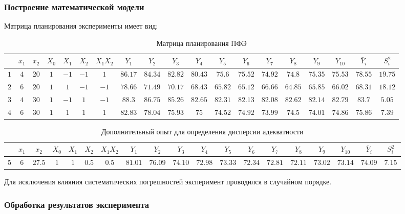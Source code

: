 \documentclass[../../AISTR.tex]{subfiles}
\begin{document}
\subsubsection{Построение математической модели}
Матрица планирования эксперименты имеет вид:
\begin{landscape}
	\begin{table}[H]
		\centering
		\begin{tabular}{|c|c|c|c|c|c|c|c|c|c|c|c|c|c|c|c|c|c|c|}
			\hline
			\textnumero & $x_1$&$x_2$&$X_0$&$X_1$&$X_2$&$X_1X_2$&$Y_1$&$Y_2$&$Y_3$&$Y_4$&$Y_5$&$Y_6$&$Y_7$&$Y_8$&$Y_9$&$Y_{10}$&$\bar{Y}_i$&$S_i^2$\\
			\hline
			$1$& $4$&	$20$&	$1$&	$-1$	&$-1$&	$1$&	$86.17$	&$84.34$&	$82.82$&	$80.43$&$	75.6$&	$75.52$&	$74.92$&	$74.8$&$	75.35$&	$75.53$&	$78.55$	&$19.75$
			\\
			\hline
			$2$&	$6$&	$20$&	$1$&	$1$&	$-1$&$	-1$&	$78.66$&	$71.49$&	$70.17$&	$68.43$&	$65.82$&	$65.12$&	$66.66$	&$64.85$&	$65.85$&	$66.02$&	$68.31$&	$18.12$
			\\
			\hline
			$3$&	$4$&	$30$&$	1$&	$-1$&	$1$	&$-1$	&$88.3$&	$86.75$&	$85.26$&	$82.65$&	$82.31$&	$82.13$&	$82.08$&	$82.62$&	$82.14$&	$82.79$	&$83.7$&	$5.05$
			\\
			\hline
			$4$	&$6$&	$30$	&$1$&	$1$&	$1$&	$1$&	$82.83$&	$78.04$&	$75.93$&	$75$	&$74.52$&	$74.92$&	$73.99$&	$74.5$&	$74.01$&	$74.86$&	$75.86$&	$7.39$
			\\
			\hline			
		\end{tabular}
	\caption{Матрица планирования ПФЭ}
	\end{table}

\begin{table}[H]
	\centering
	\begin{tabular}{|c|c|c|c|c|c|c|c|c|c|c|c|c|c|c|c|c|c|c|}
		\hline
		\textnumero & $x_1$&$x_2$&$X_0$&$X_1$&$X_2$&$X_1X_2$&$Y_1$&$Y_2$&$Y_3$&$Y_4$&$Y_5$&$Y_6$&$Y_7$&$Y_8$&$Y_9$&$Y_{10}$&$\bar{Y}_i$&$S_i^2$\\
		\hline
		$5$& $6$&	$27.5$&	$1$&	$1$	&$0.5$&	$0.5$&	$81.01$	&$76.09$&	$74.10$&	$72.98$&$	73.33$&	$72.34$&	$72.81$&	$72.11$&$	73.02$&	$73.14$&	$74.09$	&$7.15$
		\\
		\hline			
	\end{tabular}
	\caption{Дополнительный опыт для определения дисперсии адекватности}
	\label{tab:adek}
\end{table}
\end{landscape}
Для исключения влияния систематических погрешностей эксперимент проводился в случайном порядке.
\subsubsection{Обработка результатов эксперимента}
\end{document}
